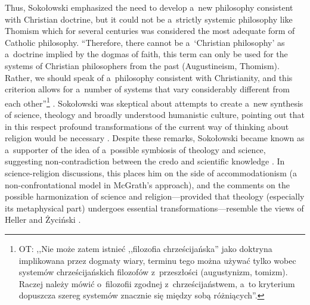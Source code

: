 Thus, Sokołowski emphasized the need to develop a~new philosophy consistent with Christian doctrine, but it could not be a~strictly systemic philosophy like Thomism which for several centuries was considered the most adequate form of Catholic philosophy. ``Therefore, there cannot be a~‘Christian philosophy' as a~doctrine implied by the dogmas of faith, this term can only be used for the systems of Christian philosophers from the past (Augustineism, Thomism). Rather, we should speak of a~philosophy consistent with Christianity, and this criterion allows for a~number of systems that vary considerably different from each other''\footnote{OT: ,,Nie może zatem istnieć ,,filozofia chrześcijańska'' jako doktryna implikowana przez dogmaty wiary, terminu tego można używać tylko wobec systemów chrześcijańskich filozofów z~przeszłości (augustynizm, tomizm). Raczej należy mówić o~filozofii zgodnej z~chrześcijaństwem, a~to kryterium dopuszcza szereg systemów znacznie się między sobą różniących''.} 
\parencite[][p.199]{}. %
 Sokołowski was skeptical about attempts to create a~new synthesis of science, theology and broadly understood humanistic culture, pointing out that in this respect profound transformations of the current way of thinking about religion would be necessary 
\parencite[][p.265]{}. %
 Despite these remarks, Sokołowski became known as a~supporter of the idea of a~possible symbiosis of theology and science, suggesting non-contradiction between the credo and scientific knowledge 
\parencites[se e.g.,][p.214]{}[][p.180]{}. %
 In science-religion discussions, this places him on the side of accommodationism (a non-confrontational model in McGrath's approach), and the comments on the possible harmonization of science and religion---provided that theology (especially its metaphysical part) undergoes essential transformations---resemble the views of Heller and Życiński 
\parencite[see e.g.,][]{}.%




